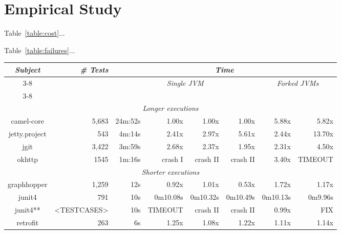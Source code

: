 \section{Empirical Study}

Table~\ref{table:cost}...

Table~\ref{table:failures}...

\begin{table*}[t]
  \centering
  \begin{tabular}{|c|r|r|r|r|r|r|r|}
    \hline
    \multirow{2}{*}{\emph{Subject}} & \multirow{2}{*}{\emph{\# Tests}} &  \multicolumn{6}{c|}{\emph{Time}}\\
    \cline{3-8}
    & & \multicolumn{4}{c|}{\emph{Single JVM}} & \multicolumn{2}{c|}{\emph{Forked JVMs}} \\
    \cline{3-8}
    & &  \multicolumn{1}{c|}{\Seq{}} &
    \multicolumn{1}{c|}{\ParClassSeqMeth{}} &
    \multicolumn{1}{c|}{\SeqClassParMeth{}} &
    \multicolumn{1}{c|}{\ParClassParMeth{}} &
    \multicolumn{1}{c|}{\Seq{}} &
    \multicolumn{1}{c|}{\ParClassSeqMeth{}}\\
    \hline
    \hline
    \multicolumn{8}{|c|}{\emph{Longer executions}} \\
    \hline
    camel-core & 5,683 & 24m:52s & 1.00x & 1.00x & 1.00x & 5.88x & 5.82x \\
    \hline
    jetty.project & 543 & 4m:14s & 2.41x & 2.97x & 5.61x & 2.44x & 13.70x \\
    \hline
    jgit & 3,422 & 3m:59s & 2.68x & 2.37x & 1.95x & 2.31x & 4.50x \\
    \hline
    okhttp & 1545 & 1m:16s & crash I & crash II & crash II & 3.40x & TIMEOUT \\
    \hline    
    \hline
    \multicolumn{8}{|c|}{\emph{Shorter executions}} \\
    \hline
    graphhopper & 1,259 & 12s & 0.92x & 1.01x & 0.53x & 1.72x & 1.17x \\
    \hline
    junit4 & 791 & 10s & 0m10.08s & 0m10.32s & 0m10.49s & 0m10.13s & 0m9.96s \\
    junit4** & <TESTCASES> & 10s & TIMEOUT & crash II & crash II & 0.99x & FIX \\
    \hline
    retrofit & 263 & 6s & 1.25x & 1.08x & 1.22x & 1.11x & 1.14x \\
    \hline
  \end{tabular}
  \caption{\label{table:cost}Test execution time.}
\end{table*}

